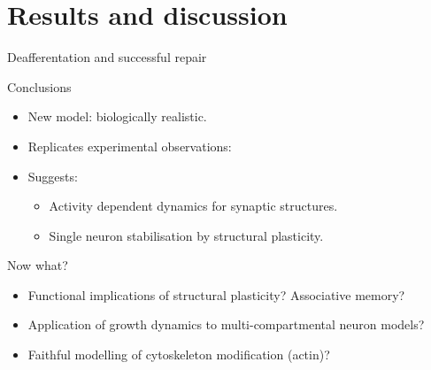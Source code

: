 \section{Results and discussion}
\begin{frame}[c]{Deafferentation and successful repair}
  \begin{figure}
      \centering
      \resizebox{\textwidth}{!}{}%
  \end{figure}
\end{frame}
\begin{frame}[c]{Conclusions}
  \begin{itemize}
    \item New model: biologically realistic.
      \pause{}
    \item Replicates experimental observations:
      \pause{}
    \item Suggests:
      \begin{itemize}
        \item Activity dependent dynamics for synaptic structures.
        \item Single neuron stabilisation by structural plasticity.
      \end{itemize}
  \end{itemize}
\end{frame}
\begin{frame}[c]{Now what?}
  \begin{itemize}
    \item Functional implications of structural plasticity? Associative memory?
      \pause{}
    \item Application of growth dynamics to multi-compartmental neuron models?
      \pause{}
    \item Faithful modelling of cytoskeleton modification (actin)?
  \end{itemize}
\end{frame}

